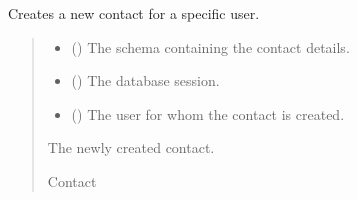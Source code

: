 \documentclass[letterpaper,10pt,english]{sphinxmanual}
\begin{document}
\begin{fulllineitems}
\label{\detokenize{index:src.repository.contacts.create_contact}}
\pysigstartsignatures
{}
\pysigstopsignatures
\sphinxAtStartPar
Creates a new contact for a specific user.
\begin{quote}\begin{description}
\begin{itemize}
\item {} 
\sphinxAtStartPar
{} () \textendash{} The schema containing the contact details.

\item {} 
\sphinxAtStartPar
{} () \textendash{} The database session.

\item {} 
\sphinxAtStartPar
{} () \textendash{} The user for whom the contact is created.

\end{itemize}

\sphinxAtStartPar
The newly created contact.

\sphinxAtStartPar
Contact

\end{description}\end{quote}

\end{fulllineitems}

\end{document}
